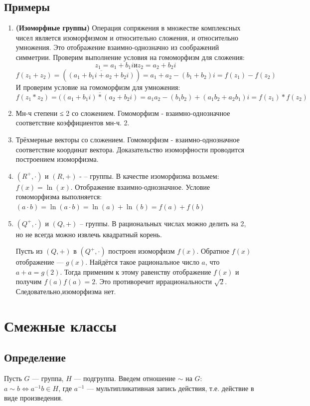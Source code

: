 \documentclass[12pt]{article}
\begin{document}
    \subsection{Примеры}
    \begin{enumerate}
        \item \textbf{(Изоморфные группы)} Операция сопряжения в множестве комплексных чисел является изоморфизмом и относительно сложения, и относительно умножения. Это отображение взаимно-однозначно из соображений симметрии. Проверим выполнение условия на гомоморфизм для сложения:
              \[
                  z_1 = a_1 + b_1i  и z_2 = a_2 + b_2i
              \]
              \[
                  f(z_1+z_2) = (\overline{(a_1 + b_1i + a_2 + b_2i)}) = a_1 + a_2 - (b_1 + b_2)i = f(z_1) - f(z_2)
              \]
              И проверим условие на гомоморфизм для умножения:
              \[
                  f(z_1*z_2)=(\overline{(a_1+b_1i)*(a_2+b_2i)}=a_1a_2-(b_1b_2)+(a_1b_2+a_2b_1)i=f(z_1)*f(z_2)
              \]
        \item Мн-ч степени ≤ 2 со сложением. Гомоморфизм - взаимно-однозначное соответствие коэффициентов мн-ч. 2.
        \item Трёхмерные векторы со сложением. Гомоморфизм - взаимно-однозначное соответствие координат вектора. Доказательство изоморфности проводится построением изоморфизма.
        \item $(R^+,\cdot)$ и $(R,+)$ - – группы. В качестве изоморфизма возьмем: $f(x) = \ln(x)$. Отображение взаимно-однозначное.
              Условие гомоморфизма выполняется: $(a · b) = \ln(a · b) = \ln(a) + \ln(b) = f(a) + f(b)$

        \item $(Q^+,\cdot)$ и $(Q,+)$ – группы. В рациональных числах можно делить на 2, но не всегда можно извлечь квадратный корень.

              Пусть из $(Q,+)$ в $(Q^+, \cdot)$  построен изоморфизм $f(x)$. Обратное $f(x)$ отображение --- $g(x)$. Найдётся такое рациональное число $a$, что $a + a = g(2)$.
              Тогда применим к этому равенству отображение $f(x)$ и получим $f(a)f(a) = 2$. Это противоречит иррациональности $\sqrt{2}$. Следовательно,изоморфизма нет.
    \end{enumerate}

    \section{Смежные классы}
    \subsection{Определение}
    Пусть $G$ --- группа, $H$ --- подгруппа. Введем отношение $\sim$ на $G$: $a\sim b \Leftrightarrow a^{-1}b\in H$, где $a^{-1}$ ---
    мультипликативная запись действия, т.е. действие в виде произведения.
\end{document}
